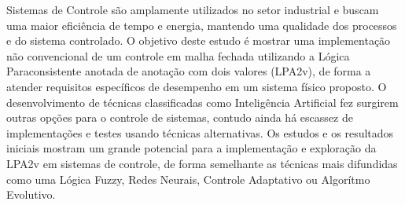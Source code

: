 





Sistemas de Controle são amplamente utilizados no setor industrial e buscam uma maior eficiência de tempo e energia, mantendo uma qualidade dos processos e do sistema controlado.
O objetivo deste estudo é mostrar uma implementação não convencional de um controle em malha fechada utilizando a Lógica Paraconsistente anotada de anotação com dois valores (LPA2v), de forma a atender requisitos específicos de desempenho em um sistema físico proposto.
O desenvolvimento de técnicas classificadas como Inteligência Artificial fez surgirem outras opções para o controle de sistemas, contudo ainda há escassez de implementações e testes usando técnicas alternativas.
Os estudos e os resultados iniciais mostram um grande potencial para a implementação e exploração da LPA2v em sistemas de controle, de forma semelhante as técnicas mais difundidas como uma Lógica Fuzzy, Redes Neurais, Controle Adaptativo ou Algorítmo Evolutivo.


